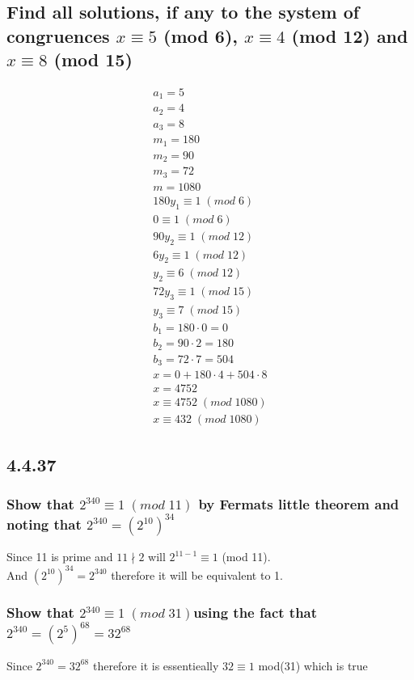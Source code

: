 \documentclass[12pt, a4paper]{report}
\begin{document}
			\subsection{Find all solutions, if any to the system of congruences $x\equiv 5$ (mod 6), $x\equiv 4$ (mod 12) and $x\equiv 8$ (mod 15)}
				\begin{align*}
					a_1=5\\
					a_2=4\\
					a_3=8\\
					m_1=180\\
					m_2=90\\
					m_3=72\\
					m=1080\\[4mm]
					180y_1\equiv 1\;(mod\;6)\\
					0\equiv 1\;(mod\;6)\\
					90y_2\equiv 1\;(mod\;12)\\
					6y_2\equiv 1\;(mod\;12)\\
					y_2\equiv 6\;(mod\;12)\\
					72y_3\equiv 1\;(mod\;15)\\
					y_3\equiv 7\;(mod\;15)\\[4mm]
					b_1=180\cdot 0=0\\
					b_2=90\cdot 2 = 180\\
					b_3=72\cdot 7 = 504\\[4mm]
					x=0+180\cdot 4 + 504\cdot 8\\
					x=4752\\
					x\equiv4752\;(mod\;1080)\\
					x\equiv 432\;(mod\;1080)
				\end{align*}
			\setcounter{subsection}{36}
			\subsection{4.4.37}
			\subsubsection{Show that $2^{340}\equiv 1\;(mod\;11)$ by Fermats little theorem and noting that $2^{340}=(2^{10})^{34}$}
				Since 11 is prime and $11\nmid 2$ will $2^{11-1}\equiv 1$ (mod 11).\\
				And $(2^{10})^{34}=2^{340}$ therefore it will be equivalent to 1.
			\subsubsection{Show that $2^{340}\equiv 1\;(mod\;31)$using the fact that $2^{340}=(2^5)^{68}=32^{68}$}
			Since $2^{340}=32^{68}$ therefore it is essentieally $32 \equiv 1$ mod(31) which is true\\ 
\end{document}
